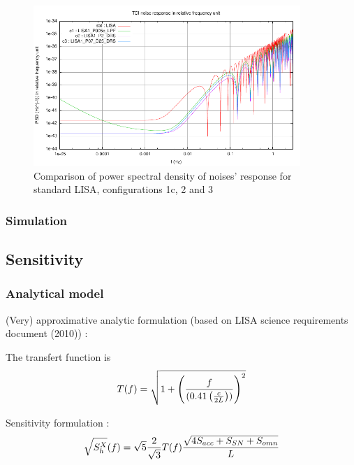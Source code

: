 \documentclass{iopart}
\begin{document}
\begin{figure}[H]
\begin{center}
\includegraphics[width=0.9\textwidth]{FigNoiseOrbSens/PSD-Noise_std-c1-c2-c3}
\caption{Comparison of power spectral density of noises' response for standard LISA, configurations 1c, 2 and 3}
\label{F:PSDNoiseCompC1C2C3}
\end{center}
\end{figure}



\subsubsection{Simulation}
\label{SSS:Inst:PSD:Sim}






\subsection{Sensitivity}
\label{SS:Inst:Sensitivty}

\subsubsection{Analytical model}
\label{SSS:Inst:PSD:Ana}

(Very) approximative analytic formulation (based on LISA science requirements document (2010)) : 

The transfert function is 
\begin{equation}
T(f) = \sqrt{ 1 + \left( { f \over (0.41 \left({c \over 2 L} \right) )} \right)^2 }
\label{TransfertLISA}
\end{equation}

Sensitivity formulation :
\begin{equation}
\sqrt{S^{X}_h}(f) = \sqrt{5}  {2 \over \sqrt{3}} T(f)  { \sqrt{ 4 S_{acc} + S_{SN} + S_{omn} } \over L}
\label{AppSensXLISA}
\end{equation}
\end{document}

